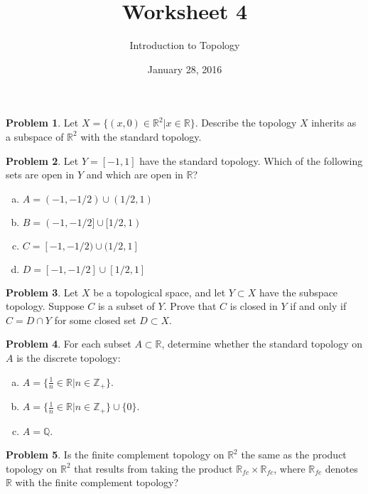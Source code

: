 \documentclass{amsart}
\newcommand{\+}[1]{\ensuremath{\mathbf{#1}}}
\newcommand{\Z}{{\mathbb Z}}
\newcommand{\Q}{{\mathbb Q}}
\newcommand{\R}{{\mathbb R}}
\theoremstyle{definition}
\newtheorem{prob}{Problem}
\begin{document}
\title{Worksheet 4}
\date{January 28, 2016}
\author{Introduction to Topology}

\maketitle

\begin{prob}
Let $X = \{(x,0) \in \R^2 \vert x \in \R\}$.  Describe the topology $X$ inherits as a subspace of $\R^2$ with the
standard topology.
\end{prob}



\begin{prob}
 Let $Y = [-1,1]$ have the standard topology.  Which of the following sets are open in $Y$ and
 which are open in $\R$?
 \begin{enumerate}[(a)]
  \item $A = (-1, -1/2) \cup (1/2,1)$ 
  \item $B = (-1, -1/2] \cup [1/2,1)$
  \item $C = [-1, -1/2) \cup (1/2,1]$
  \item $D = [-1, -1/2] \cup [1/2,1]$
 \end{enumerate}
\end{prob}


\begin{prob}
 Let $X$ be a topological space, and let $Y \subset X$ have the subspace topology.  Suppose $C$ is a subset of $Y$.
 Prove that  $C$ is closed in $Y$ if and only if $C = D \cap Y$ for some closed set $D \subset X$. 
\end{prob}

\begin{prob}
For each subset $A \subset \R$, determine whether the standard topology on $A$ is the discrete topology:
\begin{enumerate}[(a)]
 \item $A = \{\frac{1}{n} \in \R \vert n \in \Z_+\}$.
 \item $A = \{\frac{1}{n} \in \R \vert n \in \Z_+\} \cup \{0\}$.
 \item $A = \Q$.
\end{enumerate}
\end{prob}

\begin{prob}
 Is the finite complement topology on $\R^2$ the same as the product topology on $\R^2$ that results from taking
 the product $\R_{fc} \times \R_{fc}$, where $\R_{fc}$ denotes $\R$ with the finite complement topology?
\end{prob}
\end{document}
